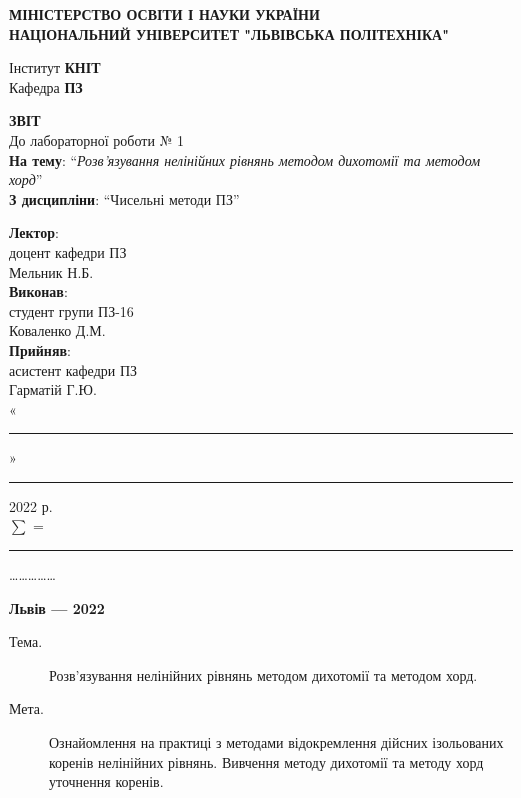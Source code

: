\documentclass{article}
\newcommand\subject{Чисельні методи ПЗ}
\newcommand\lecturer{доцент кафедри ПЗ\\Мельник Н.Б.}
\newcommand\teacher{асистент кафедри ПЗ\\Гарматій Г.Ю.}
\newcommand\mygroup{ПЗ-16}
\newcommand\lab{1}
\newcommand\theme{Розв’язування нелінійних рівнянь методом дихотомії та методом хорд}
\newcommand\purpose{Ознайомлення на практиці з методами відокремлення дійсних ізольованих коренів нелінійних рівнянь. Вивчення методу дихотомії та методу хорд уточнення коренів}
\begin{document}
\begin{normalsize}
	\begin{titlepage}
		\thispagestyle{empty}
		\begin{center}
			\textbf{МІНІСТЕРСТВО ОСВІТИ І НАУКИ УКРАЇНИ\\
				НАЦІОНАЛЬНИЙ УНІВЕРСИТЕТ "ЛЬВІВСЬКА ПОЛІТЕХНІКА"}
		\end{center}
		\begin{flushright}
			Інститут \textbf{КНІТ}\\
			Кафедра \textbf{ПЗ}
		\end{flushright}
		\vspace{200pt}
		\begin{center}
			\textbf{ЗВІТ}\\
			\vspace{10pt}
			До лабораторної роботи № \lab\\
			\textbf{На тему}: “\textit{\theme}”\\
			\textbf{З дисципліни}: “\subject”
		\end{center}
		\vspace{112pt}
		\begin{flushright}
			
			\textbf{Лектор}:\\
			\lecturer\\
			\vspace{28pt}
			\textbf{Виконав}:\\
			
			студент групи \mygroup\\
			Коваленко Д.М.\\
			\vspace{28pt}
			\textbf{Прийняв}:\\
			
			\teacher\\
			
			\vspace{28pt}
			«\rule{1cm}{0.15mm}» \rule{1.5cm}{0.15mm} 2022 р.\\
			$\sum$ = \rule{1cm}{0.15mm}……………\\
			
		\end{flushright}
		\vspace{\fill}
		\begin{center}
			\textbf{Львів — 2022}
		\end{center}
	\end{titlepage}
		
	\begin{description}
		\item[Тема.] \theme.
		\item[Мета.] \purpose.
	\end{description}
	

\end{normalsize}
\end{document}
